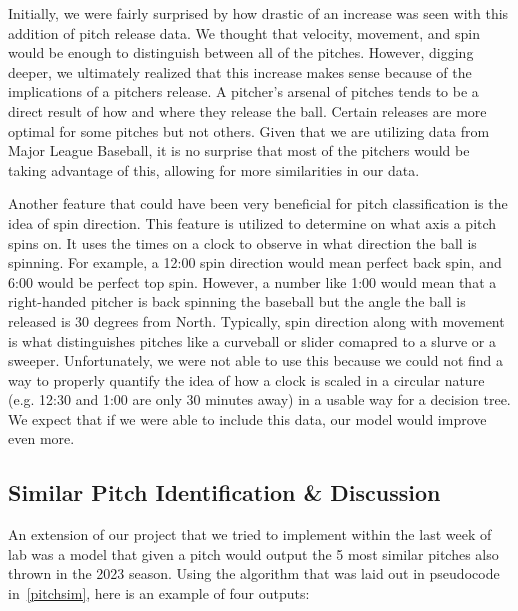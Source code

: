 \documentclass{article}
\begin{document}
Initially, we were fairly
surprised by how drastic of an increase was seen with this addition of pitch release data. We thought that velocity, movement, and
spin would be enough to distinguish between all of the pitches. However, digging deeper, we ultimately
realized that this increase makes sense because of the implications of a pitchers release. A pitcher's
arsenal of pitches tends to be a direct result of how and where they release the ball. Certain releases
are more optimal for some pitches but not others. Given that we are utilizing data from Major League Baseball, it is no
surprise that most of the pitchers would be taking advantage of this, allowing for more similarities in our data.

Another feature that could have been very beneficial for pitch classification is the idea of spin direction.
This feature is utilized
to determine on what axis a pitch spins on. It uses the times on a clock to observe in what direction the 
ball is spinning. For example, a 12:00 spin direction would mean perfect back spin, and 6:00 would be perfect
top spin. However, a number like 1:00 would mean that a right-handed pitcher is back spinning the baseball
but the angle the ball is released is 30 degrees from North. Typically, spin direction along with movement
is what distinguishes pitches like a curveball or slider comapred to a slurve or a sweeper.
Unfortunately, we were not able to use this because we could not find a way to properly quantify 
the idea of how a clock is scaled in a circular nature (e.g. 12:30 and 1:00 are only 30 minutes away) in 
a usable way for a decision tree. We expect that if we were able to include this data, our model 
would improve even more.

\subsection{Similar Pitch Identification \& Discussion}

An extension of our project that we tried to implement within the last week of lab was a model that given a
pitch would output the 5 most similar pitches also thrown in the 2023 season. Using the algorithm that was laid out in
pseudocode in~\ref{pitchsim}, here is an example of four outputs:
\end{document}
